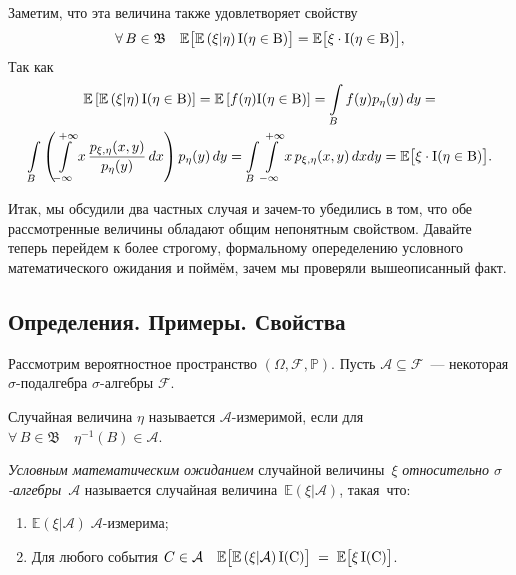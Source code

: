     \vspace{5mm}
    Заметим, что эта величина также удовлетворяет свойству
    \begin{equation*}
        \forall \, B \in \mathfrak{B} \quad \mathbb{E}\bigl[ \mathbb{E}\left( \xi | \eta\right) \rm{I}(\eta \in B)\bigr] = 
        \mathbb{E} \bigl[ \xi \cdot \rm{I}(\eta \in B) \bigr],
    \end{equation*}
    Так как
    \begin{gather*}
        \mathbb{E} \left[ \mathbb{E} \left(\xi | \eta\right) \rm{I}(\eta \in B) \right] = 
        \mathbb{E} \left[ f(\eta) \rm{I}(\eta \in B) \right] = 
        \int\limits_{B} f(y) p_{\eta}(y)\,dy = \\
        \int\limits_{B} \left( \int\limits_{-\infty}^{+\infty} x \, \frac{p_{\xi, \eta}(x, y)}{p_{\eta}(y)} \, dx \right) p_{\eta}(y) \,dy = 
        \int\limits_{B} \int\limits_{-\infty}^{+\infty} x \, p_{\xi, \eta}(x, y) \,dxdy = 
        \mathbb{E} \bigl[ \xi \cdot \rm{I}(\eta \in B)\bigr].
    \end{gather*}

    Итак, мы обсудили два частных случая и зачем-то убедились в том, что обе рассмотренные величины обладают общим непонятным свойством.
    Давайте теперь перейдем к более строгому, формальному опеределению условного математического ожидания и поймём, зачем мы проверяли вышеописанный факт.

\subsection{Определения. Примеры. Свойства}
    Рассмотрим вероятностное пространство $(\Omega, \mathcal{F}, \mathbb{P})$.
    Пусть $\mathcal{A} \subseteq \mathcal{F}$~--- некоторая $\sigma$-подалгебра $\sigma$-алгебры $\mathcal{F}$.
    \begin{defn}
        Случайная величина $\eta$ называется $\mathcal{A}$-измеримой, если для $\forall \, B \in \mathfrak{B} \quad \eta^{-1}(B) \in \mathcal{A}$.
    \end{defn}
    
    \begin{defn}
        \textit{Условным математическим ожиданием} случайной величины~$\xi$ \textit{относительно $\sigma$-алгебры}~$\mathcal{A}$ 
        называется случайная величина~$\mathbb{E}\left( \xi | \mathcal{A}\right)$, такая~что:
        \begin{enumerate}
            \item $\mathbb{E}\left(\xi | \mathcal{A} \right) \; \mathcal{A}$-измерима;
            \item Для любого события $C \in \mathcal{A} \quad \mathbb{E} \bigl[ \mathbb{E} \left( \xi | \mathcal{A} \right) \rm{I}(C) \bigr] \; = \; \mathbb{E} \bigl[ \xi \, \rm{I}(C) \bigr]$.
        \end{enumerate}
    \end{defn}

